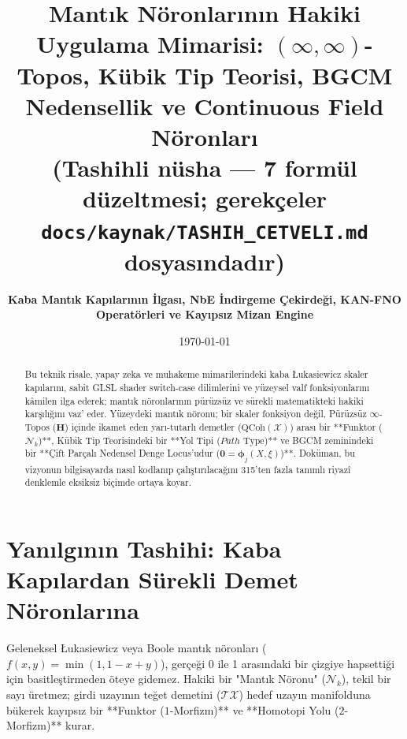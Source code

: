 \documentclass[11pt, a4paper]{article}
\title{\textbf{Mantık Nöronlarının Hakiki Uygulama Mimarisi: $(\infty, \infty)$-Topos, Kübik Tip Teorisi, BGCM Nedensellik ve Continuous Field Nöronları}\\ \normalsize\textmd{(Tashihli nüsha --- 7 formül düzeltmesi; gerekçeler \texttt{docs/kaynak/TASHIH\_CETVELI.md} dosyasındadır)}}
\author{\textbf{Kaba Mantık Kapılarının İlgası, NbE İndirgeme Çekirdeği, KAN-FNO Operatörleri ve Kayıpsız Mizan Engine}}
\date{\today}
\begin{document}
\maketitle

\begin{abstract}
Bu teknik risale, yapay zeka ve muhakeme mimarilerindeki kaba Łukasiewicz skaler kapılarını, sabit GLSL shader switch-case dilimlerini ve yüzeysel valf fonksiyonlarını kâmilen ilga ederek; mantık nöronlarının pürüzsüz ve sürekli matematikteki hakiki karşılığını vaz' eder. Yüzeydeki mantık nöronu; bir skaler fonksiyon değil, Pürüzsüz $\infty$-Topos ($\mathbf{H}$) içinde ikamet eden yarı-tutarlı demetler ($\text{QCoh}(\mathcal{X})$) arası bir **Funktor ($\mathcal{N}_k$)**, Kübik Tip Teorisindeki bir **Yol Tipi ($Path\text{ Type}$)** ve BGCM zeminindeki bir **Çift Parçalı Nedensel Denge Locus'udur ($\mathbf{0} = \bm{\phi}_j(X, \xi)$)**. Doküman, bu vizyonun bilgisayarda nasıl kodlanıp çalıştırılacağını 315'ten fazla tanımlı riyazî denklemle eksiksiz biçimde ortaya koyar.
\end{abstract}

\section{Yanılgının Tashihi: Kaba Kapılardan Sürekli Demet Nöronlarına}

Geleneksel Łukasiewicz veya Boole mantık nöronları ($f(x, y) = \min(1, 1-x+y)$), gerçeği 0 ile 1 arasındaki bir çizgiye hapsettiği için basitleştirmeden öteye gidemez. Hakiki bir "Mantık Nöronu" ($\mathcal{N}_k$), tekil bir sayı üretmez; girdi uzayının teğet demetini ($\mathcal{T}\mathcal{X}$) hedef uzayın manifolduna bükerek kayıpsız bir **Funktor ($1$-Morfizm)** ve **Homotopi Yolu ($2$-Morfizm)** kurar.
\end{document}
